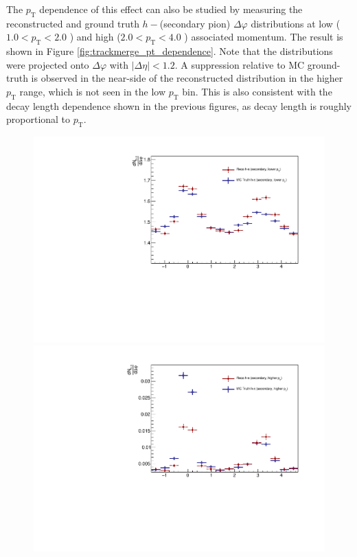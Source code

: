The $p_\text{T}$ dependence of this effect can also be studied by measuring the reconstructed and ground truth $h-$(secondary pion) $\Delta\varphi$ distributions at low ($1.0 < p_{\text{T}} < 2.0$ \GeVc) and high ($2.0 < p_{\text{T}} < 4.0$ \GeVc) associated momentum. The result is shown in Figure \ref{fig:trackmerge_pt_dependence}. Note that the distributions were projected onto $\Delta\varphi$ with $|\Delta\eta| < 1.2$. A suppression relative to MC ground-truth is observed in the near-side of the reconstructed distribution in the higher $p_\text{T}$ range, which is not seen in the low $p_\text{T}$ bin. This is also consistent with the decay length dependence shown in the previous figures, as decay length is roughly proportional to $p_\text{T}$.

\begin{figure}[ht]
	\centering
	\begin{minipage}{0.48\textwidth}
		\includegraphics[width=\textwidth]{figures/analysis/h_pion_dphi_secondary_0_2.pdf}
	\end{minipage}
	\begin{minipage}{0.48\textwidth}
		\includegraphics[width=\textwidth]{figures/analysis/h_pion_dphi_secondary_2_4.pdf}

\end{minipage}
\end{figure}
